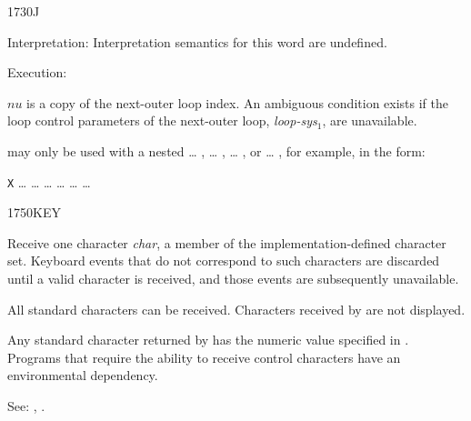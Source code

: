\begin{newword*}{1730}{J}
\item[Interpretation:]
	Interpretation semantics for this word are undefined.

\item[Execution:]

	$n$\textbar$u$ is a copy of the next-outer loop index. An
	ambiguous condition exists if the loop control parameters of the
	next-outer loop, \emph{loop-sys}$_1$, are unavailable.

	\begin{rationale} %
		 may only be used with a nested
		 {\ldots} ,
		 {\ldots} ,
		 {\ldots} , or
		 {\ldots} ,
		for example, in the form:

		\tab \word{:} \texttt{X}
			{\ldots} 
				{\ldots} 
					{\ldots}  {\ldots}
			{\ldots} 
		{\ldots} \word{;}
	\end{rationale}
\end{newword*}


\begin{newword}{1750}{KEY}

	Receive one character \emph{char}, a member of the
	implementation-defined character set. Keyboard events that do
	not correspond to such characters are discarded until a valid
	character is received, and those events are subsequently
	unavailable.

	All standard characters can be received. Characters received by
	 are not displayed.

	Any standard character returned by  has the numeric
	value specified in .
	Programs that require the ability to receive control characters
	have an environmental dependency.

\item[See:]
	,
	.
\end{newword}


